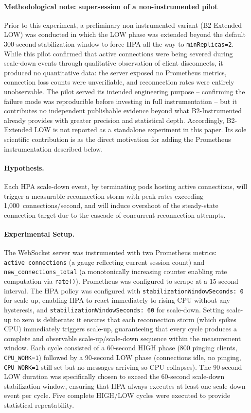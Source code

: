 \documentclass[twocolumn]{svjour3}
\begin{document}
\paragraph{Methodological note: supersession of a non-instrumented pilot}
Prior to this experiment, a preliminary non-instrumented variant (B2-Extended LOW) was conducted in which the LOW phase was extended beyond the default 300-second stabilization window to force HPA all the way to \texttt{minReplicas=2}. While this pilot confirmed that active connections were being severed during scale-down events through qualitative observation of client disconnects, it produced no quantitative data: the server exposed no Prometheus metrics, connection loss counts were unverifiable, and reconnection rates were entirely unobservable. The pilot served its intended engineering purpose -- confirming the failure mode was reproducible before investing in full instrumentation -- but it contributes no independent publishable evidence beyond what B2-Instrumented already provides with greater precision and statistical depth. Accordingly, B2-Extended LOW is not reported as a standalone experiment in this paper. Its sole scientific contribution is as the direct motivation for adding the Prometheus instrumentation described below.

\paragraph{Hypothesis.} Each HPA scale-down event, by terminating pods hosting active connections, will trigger a measurable reconnection storm with peak rates exceeding 1,000~connections/second, and will induce overshoot of the steady-state connection target due to the cascade of concurrent reconnection attempts.

\paragraph{Experimental Setup.} The WebSocket server was instrumented with two Prometheus metrics: \texttt{active\_connections} (a gauge reflecting current session count) and \texttt{new\_connections\_total} (a monotonically increasing counter enabling rate computation via \texttt{rate()}). Prometheus was configured to scrape at a 15-second interval. The HPA policy was configured with \texttt{stabilizationWindowSeconds: 0} for scale-up, enabling HPA to react immediately to rising CPU without any hysteresis, and \texttt{stabilizationWindowSeconds: 60} for scale-down. Setting scale-up to zero is deliberate: it ensures that each reconnection storm (which spikes CPU) immediately triggers scale-up, guaranteeing that every cycle produces a complete and observable scale-up/scale-down sequence within the measurement window. Each cycle consisted of a 60-second HIGH phase (800 pinging clients, \texttt{CPU\_WORK=1}) followed by a 90-second LOW phase (connections idle, no pinging, \texttt{CPU\_WORK=1} still set but no messages arriving so CPU collapses). The 90-second LOW duration was specifically chosen to exceed the 60-second scale-down stabilization window, ensuring that HPA always executes at least one scale-down event per cycle. Five complete HIGH/LOW cycles were executed to provide statistical repeatability.
\end{document}

